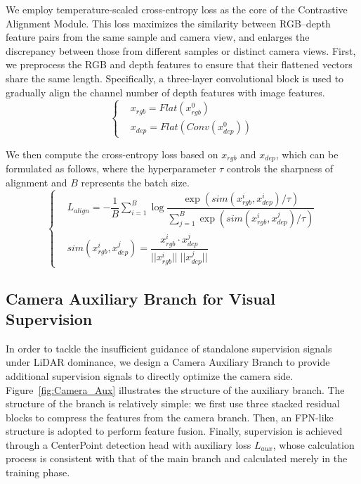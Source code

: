 \documentclass[letterpaper, 10 pt, conference]{ieeeconf}  %
\begin{document}
We employ temperature-scaled cross-entropy loss \cite{chen2020simple} as the core of the Contrastive Alignment Module. 
This loss maximizes the similarity between RGB–depth feature pairs from the same sample and camera view, and enlarges the discrepancy between those from different samples or distinct camera views.
First, we preprocess the RGB and depth features to ensure that their flattened vectors share the same length. Specifically, a three-layer convolutional block is used to gradually align the channel number of depth features with image features.
\begin{equation}
        \displaystyle
        \left\{
        \begin{aligned}
            & x_{rgb} = Flat(x_{rgb}^0)\\
            & x_{dep} = Flat(Conv(x_{dep}^0))
        \end{aligned}
        \right.
\end{equation}

We then compute the cross-entropy loss based on $x_{rgb}$ and $x_{dep}$, which can be formulated as follows, where the hyperparameter $\tau$ controls the sharpness of alignment and $B$ represents the batch size.
\begin{equation}
        \displaystyle
        \left\{
        \begin{aligned}
            & L_{align}=-\dfrac{1}{B}\sum_{i=1}^{B}\log\dfrac{\exp({sim(x_{rgb}^i, x_{dep}^i)/\tau})}{\sum_{j=1}^{B}\exp({sim(x_{rgb}^i, x_{dep}^j)/\tau})}\\
            & sim(x_{rgb}^i,x_{dep}^j)=\dfrac{x_{rgb}^i \cdot x_{dep}^j}{||x_{rgb}^i||\;||x_{dep}^j||}
        \end{aligned}
        \right.
\end{equation}

\subsection{Camera Auxiliary Branch for Visual Supervision}
In order to tackle the insufficient guidance of standalone supervision signals under LiDAR dominance, we design a Camera Auxiliary Branch to provide additional supervision signals to directly optimize the camera side.  Figure~\ref{fig:Camera_Aux} illustrates the structure of the auxiliary branch. The structure of the branch is relatively simple: we first use three stacked residual blocks to compress the features from the camera branch. Then, an FPN-like structure is adopted to perform feature fusion. Finally, supervision is achieved through a CenterPoint detection head \cite{yin2021center} with auxiliary loss $L_{aux}$, whose calculation process is consistent with that of the main branch \cite{liu2023bevfusion} and calculated merely in the training phase.
\end{document}
